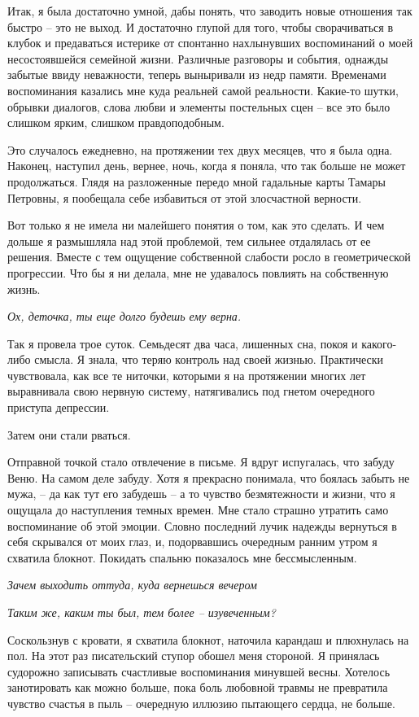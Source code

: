 \documentclass[
]{book}
\begin{document}
Итак, я была достаточно умной, дабы понять, что заводить новые отношения так быстро -- это не выход. И достаточно глупой для того, чтобы сворачиваться в клубок и предаваться истерике от спонтанно нахлынувших воспоминаний о моей несостоявшейся семейной жизни. Различные разговоры и события, однажды забытые ввиду неважности, теперь выныривали из недр памяти. Временами воспоминания казались мне куда реальней самой реальности. Какие-то шутки, обрывки диалогов, слова любви и элементы постельных сцен -- все это было слишком ярким, слишком правдоподобным.

Это случалось ежедневно, на протяжении тех двух месяцев, что я была одна. Наконец, наступил день, вернее, ночь, когда я поняла, что так больше не может продолжаться. Глядя на разложенные передо мной гадальные карты Тамары Петровны, я пообещала себе избавиться от этой злосчастной верности.

Вот только я не имела ни малейшего понятия о том, как это сделать. И чем дольше я размышляла над этой проблемой, тем сильнее отдалялась от ее решения. Вместе с тем ощущение собственной слабости росло в геометрической прогрессии. Что бы я ни делала, мне не удавалось повлиять на собственную жизнь.

\emph{Ох, деточка, ты еще долго будешь ему верна.}

Так я провела трое суток. Семьдесят два часа, лишенных сна, покоя и какого-либо смысла. Я знала, что теряю контроль над своей жизнью. Практически чувствовала, как все те ниточки, которыми я на протяжении многих лет выравнивала свою нервную систему, натягивались под гнетом очередного приступа депрессии.

Затем они стали рваться.

Отправной точкой стало отвлечение в письме. Я вдруг испугалась, что забуду Веню. На самом деле забуду. Хотя я прекрасно понимала, что боялась забыть не мужа, -- да как тут его забудешь -- а то чувство безмятежности и жизни, что я ощущала до наступления темных времен. Мне стало страшно утратить само воспоминание об этой эмоции. Словно последний лучик надежды вернуться в себя скрывался от моих глаз, и, подорвавшись очередным ранним утром я схватила блокнот. Покидать спальню показалось мне бессмысленным.

\emph{Зачем выходить оттуда, куда вернешься вечером}

\emph{Таким же, каким ты был, тем более -- изувеченным?}

Соскользнув с кровати, я схватила блокнот, наточила карандаш и плюхнулась на пол. На этот раз писательский ступор обошел меня стороной. Я принялась судорожно записывать счастливые воспоминания минувшей весны. Хотелось занотировать как можно больше, пока боль любовной травмы не превратила чувство счастья в пыль -- очередную иллюзию пытающего сердца, не больше.
\end{document}
